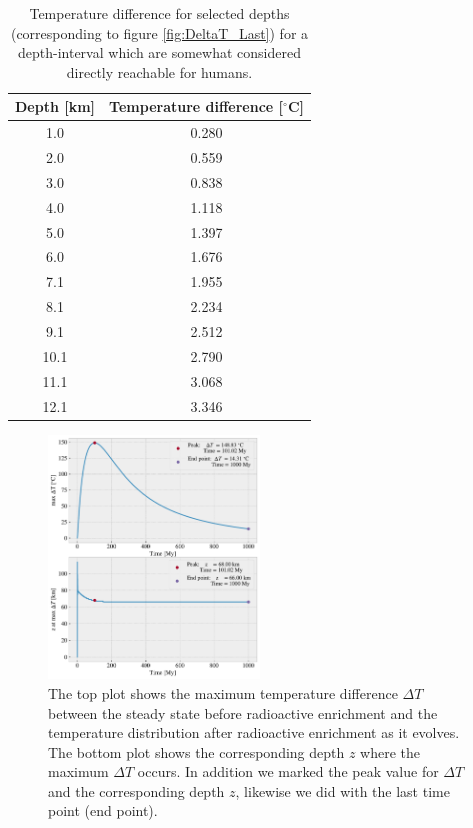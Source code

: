 \documentclass[%
 reprint,
nofootinbib,
aps,
]{revtex4-1}
\begin{document}
\begin{table}[H]
  \begin{center}
  \caption{Temperature difference for selected depths (corresponding to figure \ref{fig:DeltaT_Last}) for a depth-interval which are somewhat considered directly reachable for humans.}
  \begin{tabular}{|c|c|} \hline
      \textbf{Depth [km]} & \textbf{Temperature difference [$^{\circ}$C]} \\ \hline
      1.0 & 0.280 \\ \hline
      2.0 & 0.559 \\ \hline
      3.0 & 0.838 \\ \hline
      4.0 & 1.118 \\ \hline
      5.0 & 1.397 \\ \hline
      6.0 & 1.676 \\ \hline
      7.1 & 1.955 \\ \hline
      8.1 & 2.234 \\ \hline
      9.1 & 2.512 \\ \hline
      10.1 & 2.790 \\ \hline
      11.1 & 3.068 \\ \hline
      12.1 & 3.346 \\ \hline
  \end{tabular}
  \label{tab:max_diff}
  \end{center}
\end{table}
\begin{figure}[H]
    \centering
    \includegraphics[width=0.5\textwidth]{figures/DeltaT.pdf}
    \caption{The top plot shows the maximum temperature difference $\Delta T$ between the steady state before radioactive enrichment and the temperature distribution after radioactive enrichment as it evolves. The bottom plot shows the corresponding depth $z$ where the maximum $\Delta T$ occurs. In addition we marked the peak value for $\Delta T$ and the corresponding depth $z$, likewise we did with the last time point (end point).}
    \label{fig:DeltaT}
\end{figure}
\end{document}
